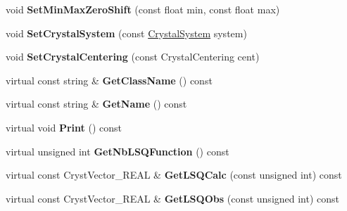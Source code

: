 \begin{DoxyCompactItemize}
\mbox{\label{class_obj_cryst_1_1_cell_explorer_a91d0eedc650c3b4c2f062011b101fbd1}} 
void {\bfseries Set\+Min\+Max\+Zero\+Shift} (const float min, const float max)
\item 
\mbox{\label{class_obj_cryst_1_1_cell_explorer_a7b1dbaf22380e1ac581be1827930c9ba}} 
void {\bfseries Set\+Crystal\+System} (const \mbox{\hyperlink{namespace_obj_cryst_a9cd1d00f4ec9f0e75564ee151f47dd83}{Crystal\+System}} system)
\item 
\mbox{\label{class_obj_cryst_1_1_cell_explorer_a37548d6bf7f5ff9b6908e097a830dc2c}} 
void {\bfseries Set\+Crystal\+Centering} (const Crystal\+Centering cent)
\item 
\mbox{\label{class_obj_cryst_1_1_cell_explorer_a6796f5292d5a245377dd5ac2bc5b6558}} 
virtual const string \& {\bfseries Get\+Class\+Name} () const
\item 
\mbox{\label{class_obj_cryst_1_1_cell_explorer_a6fb51109080587447be61b83a8290895}} 
virtual const string \& {\bfseries Get\+Name} () const
\item 
\mbox{\label{class_obj_cryst_1_1_cell_explorer_aec37a9cc938b896e54de1c4d12e7fb5e}} 
virtual void {\bfseries Print} () const
\item 
\mbox{\label{class_obj_cryst_1_1_cell_explorer_ab81b9cf487e1bfaf7326e67672eb7bc8}} 
virtual unsigned int {\bfseries Get\+Nb\+L\+S\+Q\+Function} () const
\item 
\mbox{\label{class_obj_cryst_1_1_cell_explorer_aa6ea6f8448112b467cf8c9445aebc5ae}} 
virtual const Cryst\+Vector\+\_\+\+R\+E\+AL \& {\bfseries Get\+L\+S\+Q\+Calc} (const unsigned int) const
\item 
\mbox{\label{class_obj_cryst_1_1_cell_explorer_a177228ea44e6c15d7641494ad0f70b24}} 
virtual const Cryst\+Vector\+\_\+\+R\+E\+AL \& {\bfseries Get\+L\+S\+Q\+Obs} (const unsigned int) const
\item 

\end{DoxyCompactItemize}
